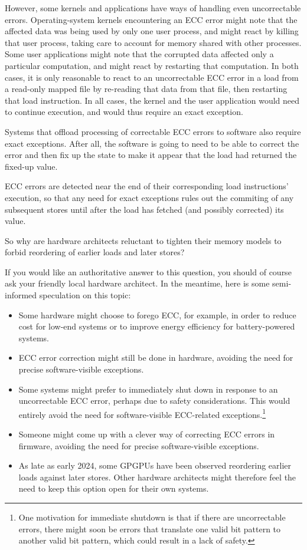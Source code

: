 \documentclass[10]{article}
\begin{document}
However, some kernels and applications have ways of handling even
uncorrectable errors.
Operating-system kernels encountering an ECC error might note that the
affected data was being used by only one user process, and might react by
killing that user process, taking care to account for memory shared with
other processes.
Some user applications might note that the corrupted data affected only
a particular computation, and might react by restarting that computation.
In both cases, it is only reasonable to react to an uncorrectable ECC
error in a load from a read-only mapped file by re-reading that data
from that file, then restarting that load instruction.
In all cases, the kernel and the user application would need to continue
execution, and would thus require an exact exception.

Systems that offload processing of correctable ECC errors to software
also require exact exceptions.
After all, the software is going to need to be able to correct the error
and then fix up the state to make it appear that the load had returned
the fixed-up value.

ECC errors are detected near the end of their corresponding load
instructions' execution, so that any need for exact exceptions rules out
the commiting of any subsequent stores until after the load has fetched
(and possibly corrected) its value.

So why are hardware architects reluctant to tighten their memory models
to forbid reordering of earlier loads and later stores?

If you would like an authoritative answer to this question, you should of
course ask your friendly local hardware architect.
In the meantime, here is some semi-informed speculation on this topic:

\begin{itemize}
\item	Some hardware might choose to forego ECC, for example, in order to
	reduce cost for low-end systems or to improve energy efficiency
	for battery-powered systems.
\item	ECC error correction might still be done in hardware, avoiding
	the need for precise software-visible exceptions.
\item	Some systems might prefer to immediately shut down in response to
	an uncorrectable ECC error, perhaps due to safety considerations.
	This would entirely avoid the need for software-visible
	ECC-related exceptions.\footnote{
		One motivation for immediate shutdown is that if there
		are uncorrectable errors, there might soon be errors
		that translate one valid bit pattern to another valid
		bit pattern, which could result in a lack of safety.}
\item	Someone might come up with a clever way of correcting ECC errors
	in firmware, avoiding the need for precise software-visible
	exceptions.
\item	As late as early 2024, some GPGPUs have been observed reordering
	earlier loads against later stores.
	Other hardware architects might therefore feel the need to keep
	this option open for their own systems.
\end{itemize}
\end{document}
